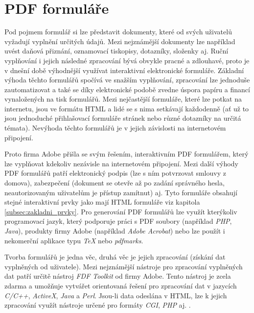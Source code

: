\section{PDF formuláře}
Pod pojmem formulář si lze představit dokumenty, které od svých uživatelů vyžadují vyplnění určitých údajů. Mezi nejznámější dokumenty lze například uvést daňová přiznání, oznamovací tiskopisy, dotazníky, složenky aj. Ruční vyplňování i jejich následné zpracování bývá obvykle pracné a zdlouhavé, proto je v dnešní době výhodnější využívat interaktivní elektronické formuláře. Základní výhoda těchto formulářů spočívá ve snažším vyplňování, zpracování lze jednoduše zautomatizovat a také se díky elektronické podobě zvedne úspora papíru a financí vynaložených na tisk formulářů.  Mezi nejčastější formuláře, které lze potkat na internetu, jsou ve formátu HTML a lidé se s nima setkávají každodenně (ať už to jsou jednoduché přihlašovací formuláře stránek nebo různé dotazníky na určitá témata). Nevýhoda těchto formulářů je v jejich závislosti na internetovém připojení. 
\par
Proto firma Adobe přišla se svým řešením, interaktivním PDF formulářem, který lze vyplňovat kdekoliv nezávisle na internetovém připojení. Mezi další výhody PDF formulářů patří elektronický podpis (lze s ním potvrzovat smlouvy z domova), zabezpečení (dokument se otevře až po zadání správného hesla, neautorizovaným uživatelům je přístup zamítnut) aj. Tyto formuláře obsahují stejné interaktivní prvky jako mají HTML formuláře viz kapitola \ref{subsec:zakladni_prvky}. Pro generování PDF formulářů lze využít kterýkoliv programovací jazyk, který podporuje práci s PDF soubory (například \textit{PHP}, \textit{Java}), produkty firmy Adobe (například \textit{Adobe Acrobat}) nebo lze použít i nekomerční aplikace typu \textit{TeX} nebo \textit{pdfmarks}.
\par
Tvorba formulářů je jedna věc, druhá věc je jejich zpracování (získání dat vyplněných od uživatele). Mezi nejznámější nástroje pro zpracování vyplněných dat patří určitě nástroj \textit{FDF Toolkit} od firmy Adobe. Tento nástroj je zcela zdarma a umožňuje vytvářet orientovaná řešení pro zpracování dat v jazycích \textit{C/C++}, \textit{ActiveX}, \textit{Java} a \textit{Perl}. Jsou-li data odeslána v HTML, lze k jejich zpracování využít nástroje určené pro formáty \textit{CGI}, \textit{PHP} aj. \cite{PDFForm}.
